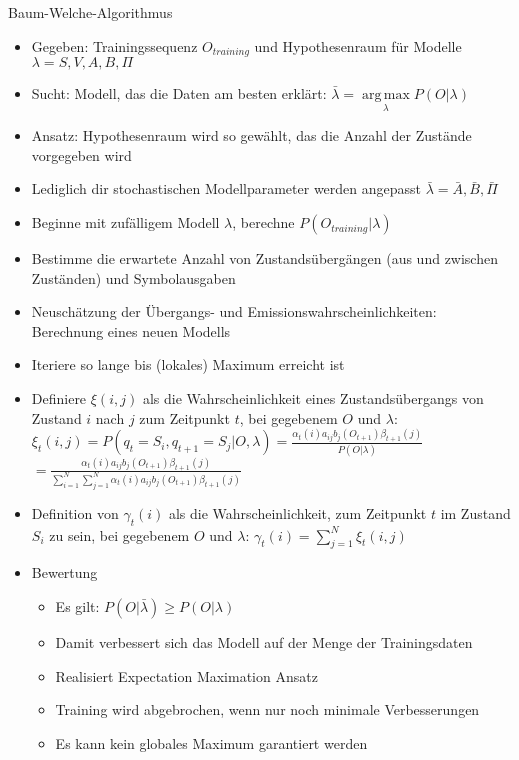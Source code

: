 \documentclass[paper=a4, fontsize=11pt]{scrartcl} %
\numberwithin{equation}{section} %
\numberwithin{figure}{section} %
\numberwithin{table}{section} %
\DeclareMathOperator*{\argmax}{arg\,max}
\begin{document}
Baum-Welche-Algorithmus
\begin{itemize}
\item Gegeben: Trainingssequenz $O_{training}$ und Hypothesenraum für Modelle $\lambda = {S,V,A,B,\Pi}$
\item Sucht: Modell, das die Daten am besten erklärt: $\bar{\lambda} = \argmax\limits_{\lambda} P(O|\lambda)$
\item Ansatz: Hypothesenraum wird so gewählt, das die Anzahl der Zustände vorgegeben wird
\item Lediglich dir stochastischen Modellparameter werden angepasst $\bar{\lambda} = {\bar{A},\bar{B},\bar{\Pi}}$
\item Beginne mit zufälligem Modell $\lambda$, berechne $P(O_{training}|\lambda)$
\item Bestimme die erwartete Anzahl von Zustandsübergängen (aus und zwischen Zuständen) und Symbolausgaben
\item Neuschätzung der Übergangs- und Emissionswahrscheinlichkeiten: Berechnung eines neuen Modells
\item Iteriere so lange bis (lokales) Maximum erreicht ist
\item Definiere $\xi(i,j)$ als die Wahrscheinlichkeit eines Zustandsübergangs von Zustand $i$ nach $j$ zum Zeitpunkt $t$, bei gegebenem $O$ und $\lambda$: \\ 
$\xi_t(i,j) = P(q_t = S_i, q_{t+1} = S_j|O,\lambda) = \frac{\alpha_t(i)a_{ij}b_j(O_{t+1})\beta_{t+1}(j)}{P(O|\lambda)}$\\ 
$= \frac{\alpha_t(i)a_{ij}b_j(O_{t+1})\beta_{t+1}(j)}{\sum\limits_{i=1}^N \sum\limits_{j=1}^N \alpha_t(i)a_{ij}b_j(O_{t+1})\beta_{t+1}(j)}$
\item Definition von $\gamma_t(i)$ als die Wahrscheinlichkeit, zum Zeitpunkt $t$ im Zustand $S_i$ zu sein, bei gegebenem $O$ und $\lambda$: $\gamma_t(i) = \sum\limits_{j=1}^N \xi_t(i,j)$
\item Bewertung
\begin{itemize}
\item Es gilt: $P(O|\bar{\lambda}) \ge P(O|\lambda)$
\item Damit verbessert sich das Modell auf der Menge der Trainingsdaten
\item Realisiert Expectation Maximation Ansatz
\item Training wird abgebrochen, wenn nur noch minimale Verbesserungen
\item Es kann kein globales Maximum garantiert werden
\end{itemize}
\end{itemize}
\end{document}
